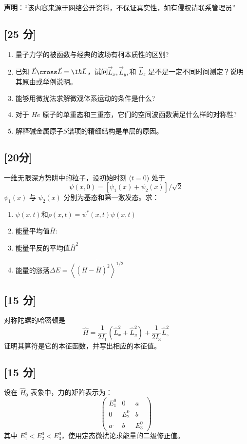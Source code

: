 
\textbf{声明}：“该内容来源于网络公开资料，不保证真实性，如有侵权请联系管理员”

\subsection{[25 分]}
\begin{enumerate}
\item 量子力学的被函数与经典的波场有柯本质性的区别?
\item 已知 $\vec L \cross \vec L = \I \hbar \vec L$，试问$\vec L_x, \vec L_y,$和 $\vec L_z$ 是不是一定不同时间测定？说明其原由或举例说明。
\item 能够用微扰法求解微观体系运动的条件是什么?
\item 对于 $He$ 原子的单重态和三重态，它们的空间波函数满足什么样的对称性?
\item 解释碱金属原子$S$谱项的精细结构是单层的原因。
\end{enumerate}
\subsection{[20分]}
一维无限深方势阱中的粒子，设初始时刻 ($t = 0$) 处于
\[
\psi(x, 0) = [\psi_1(x) + \psi_2(x)]/\sqrt{2}~
\]
$\psi_1(x)$ 与 $\psi_2(x)$ 分别为基态和第一激发态。求：
\begin{enumerate}
\item $\psi(x, t)$和$\rho(x,t) = \psi^*(x,t)\psi(x,t)$
\item 能量平均值$\overline{H} $:
\item 能量平反的平均值$\overline{H}^2 $
\item 能量的涨落$\Delta E =\overline{\left\langle \left( H - \overline{H} \right)^2\right\rangle^{1/2}}$
\end{enumerate}
\subsection{[15 分]}
对称陀螺的哈密顿是\[\hat{H} = \frac{1}{2I_1} \left( \hat{L}_x^2 + \hat{L}_y^2 \right) + \frac{1}{2I_3} \hat{L}_z^2~\]
证明其算符是它的本征函数，并写出相应的本征值。
\subsection{[15 分]}
设在 $\hat H_0$ 表象中，力的矩阵表示为：
\[
\begin{pmatrix}
E_1^0 & 0 & a \\
0 & E_2^0 & b \\
a^. & b & E_3^0
\end{pmatrix}~
\]
其中 $E_1^0 < E_2^0 < E_3^0$，使用定态微扰论求能量的二级修正值。
